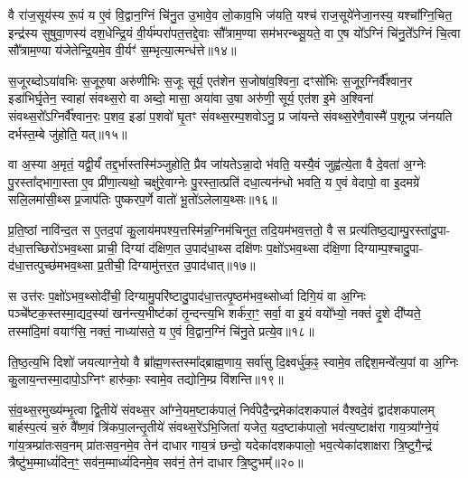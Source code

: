 वै रा॑ज॒सूय॑स्य रू॒पं य ए॒वं वि॒द्वान॒ग्निं चि॑नु॒त उ॒भावे॒व लो॒काव॒भि ज॑यति॒ यश्च॑ राज॒सूये॑नेजा॒नस्य॒ यश्चा᳚ग्नि॒चित॒ इन्द्र॑स्य सुषुवा॒णस्य॑ दश॒धेन्द्रि॒यं वी॒र्य॑म्परा॑पत॒त्तद्दे॒वाः सौ᳚त्राम॒ण्या सम॑भरन्थ्सू॒यते॒ वा ए॒ष यो᳚\-ऽग्निं चि॑नु॒ते᳚\-ऽग्निं चि॒त्वा सौ᳚त्राम॒ण्या य॑जेतेन्द्रि॒यमे॒व वी॒र्यꣳ॑ स॒म्भृत्या॒त्मन्ध॑त्ते॥१४॥

{}

स॒जूरब्दो\-ऽया॑वभिः स॒जूरु॒षा अरु॑णीभिः स॒जूः सूर्य॒ एत॑शेन स॒जोषा॑व॒श्विना॒ दꣳसो॑भिः स॒जूर॒ग्निर्वै᳚श्वान॒र इडा॑भिर्घृ॒तेन॒ स्वाहा॑ संवथ्स॒रो वा अब्दो॒ मासा॒ अया॑वा उ॒षा अरु॑णी॒ सूर्य॒ एत॑श इ॒मे अ॒श्विना॑ संवथ्स॒रो᳚\-ऽग्निर्वै᳚श्वान॒रः प॒शव॒ इडा॑ प॒शवो॑ घृ॒तꣳ सं॑वथ्स॒रम्प॒शवो\-ऽनु॒ प्र जा॑यन्ते संवथ्स॒रेणै॒वास्मै॑ प॒शून्प्र ज॑नयति दर्भस्त॒म्बे जु॑होति॒ यत्॥१५॥

वा अ॒स्या अ॒मृतं॒ यद्वी॒र्यं॑ तद्द॒र्भास्तस्मि॑ञ्जुहोति॒ प्रैव जा॑यते\-ऽन्ना॒दो भ॑वति॒ यस्यै॒वं जुह्व॑त्ये॒ता वै दे॒वता॑ अ॒ग्नेः पु॒रस्ता᳚द्भागा॒स्ता ए॒व प्री॑णा॒त्यथो॒ चक्षु॑रे॒वाग्नेः पु॒रस्ता॒त्प्रति॑ दधा॒त्यन॑न्धो भवति॒ य ए॒वं वेदापो॒ वा इ॒दमग्रे॑ सलि॒लमा॑सी॒थ्स प्र॒जाप॑तिः पुष्करप॒र्णे वातो॑ भू॒तो॑\-ऽलेलाय॒थ्सः॥१६॥

प्र॒ति॒ष्ठां नावि॑न्द॒त स ए॒तद॒पां कु॒लाय॑मपश्य॒त्तस्मि॑न्न॒ग्निम॑चिनुत॒ तदि॒यम॑भव॒त्ततो॒ वै स प्रत्य॑तिष्ठ॒द्याम्पु॒रस्ता॑दु॒पा- द॑धा॒त्तच्छिरो॑\-ऽभव॒थ्सा प्राची॒ दिग्यां द॑क्षिण॒त उ॒पाद॑धा॒थ्स दक्षि॑णः प॒क्षो॑\-ऽभव॒थ्सा द॑क्षि॒णा दिग्याम्प॒श्चादु॒पा- द॑धा॒त्तत्पुच्छ॑मभव॒थ्सा प्र॒तीची॒ दिग्यामु॑त्तर॒त उ॒पाद॑धात्॥१७॥

स उत्त॑रः प॒क्षो॑\-ऽभव॒थ्सोदी॑ची॒ दिग्यामु॒परि॑ष्टादु॒पाद॑धा॒त्तत्पृ॒ष्ठम॑भव॒थ्सोर्ध्वा दिगि॒यं वा अ॒ग्निः पञ्चे᳚ष्टक॒स्तस्मा॒द्यद॒स्यां खन॑न्त्य॒भीष्ट॑कां तृ॒न्दन्त्य॒भि शर्क॑रा॒ꣳ॒ सर्वा॒ वा इ॒यं वयो᳚भ्यो॒ नक्तं॑ दृ॒शे दी᳚प्यते॒ तस्मा॑दि॒मां वयाꣳ॑सि॒ नक्तं॒ नाध्या॑सते॒ य ए॒वं वि॒द्वान॒ग्निं चि॑नु॒ते प्रत्ये॒व॥१८॥

ति॒ष्ठ॒त्य॒भि दिशो॑ जयत्याग्ने॒यो वै ब्रा᳚ह्म॒णस्तस्मा᳚द्ब्राह्म॒णाय॒ सर्वा॑सु दि॒क्ष्वर्धु॑क॒ꣴ॒ स्वामे॒व तद्दिश॒मन्वे᳚त्य॒पां वा अ॒ग्निः कु॒लाय॒न्तस्मा॒दापो॒\-ऽग्निꣳ हारु॑काः॒ स्वामे॒व तद्योनि॒म्प्र वि॑शन्ति॥१९॥

{\anuvakamend[{यद॑लेलाय॒थ्स उ॑त्तर॒त उ॒पाद॑धादे॒व द्वात्रिꣳ॑शच्च॥४॥}]}

सं॒व॒थ्स॒रमुख्य॑म्भृ॒त्वा द्वि॒तीये॑ संवथ्स॒र आ᳚ग्ने॒यम॒ष्टाक॑पालं॒ निर्व॑पेदै॒न्द्रमेका॑दशकपालं वैश्वदे॒वं द्वाद॑शकपालम् बार्\mbox{}हस्प॒त्यं च॒रुं वै᳚ष्ण॒वं त्रि॑कपा॒लन्तृ॒तीये॑ संवथ्स॒रे॑\-ऽभि॒जिता॑ यजेत॒ यद॒ष्टाक॑पालो॒ भव॑त्य॒ष्टाक्ष॑रा गाय॒त्र्या᳚ग्ने॒यं गा॑य॒त्रम्प्रा॑तःसव॒नम् प्रा॑तःसव॒नमे॒व तेन॑ दाधार गाय॒त्रं छन्दो॒ यदेका॑दशकपालो॒ भव॒त्येका॑दशाक्षरा त्रि॒ष्टुगै॒न्द्रं त्रैष्टु॑भ॒म्माध्यं॑दिन॒ꣳ॒ सव॑न॒म्माध्यं॑दिनमे॒व सव॑नं॒ तेन॑ दाधार त्रि॒ष्टुभम्᳚॥२०॥

